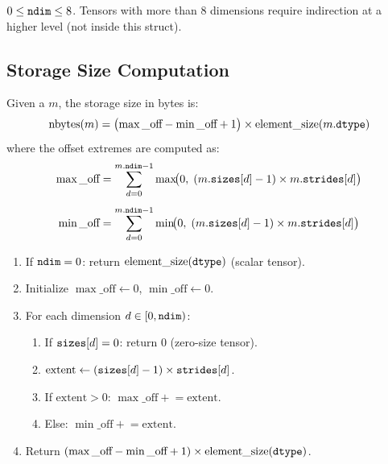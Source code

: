 \begin{invariant}
$0 \le \texttt{ndim} \le 8$.  Tensors with more than 8 dimensions
require indirection at a higher level (not inside this struct).
\end{invariant}

\subsection{Storage Size Computation}
\label{sec:storage-nbytes}

\begin{definition}
\label{def:storage-nbytes}
Given a  $m$, the storage size in bytes is:
\[
  \operatorname{nbytes}(m) = \bigl(\max\_\text{off} - \min\_\text{off} + 1\bigr)
    \times \operatorname{element\_size}(m.\texttt{dtype})
\]
where the offset extremes are computed as:
\begin{align*}
  \max\_\text{off} &= \sum_{d=0}^{m.\texttt{ndim}-1}
    \max\!\bigl(0,\; (m.\texttt{sizes}[d] - 1) \times m.\texttt{strides}[d]\bigr) \\[4pt]
  \min\_\text{off} &= \sum_{d=0}^{m.\texttt{ndim}-1}
    \min\!\bigl(0,\; (m.\texttt{sizes}[d] - 1) \times m.\texttt{strides}[d]\bigr)
\end{align*}
\end{definition}

\begin{algorithm_spec}
\label{alg:storage-nbytes}
\begin{enumerate}
  \item If $\texttt{ndim} = 0$: return $\operatorname{element\_size}(\texttt{dtype})$ (scalar tensor).
  \item Initialize $\max\_\text{off} \leftarrow 0$, $\min\_\text{off} \leftarrow 0$.
  \item For each dimension $d \in [0, \texttt{ndim})$:
    \begin{enumerate}
      \item If $\texttt{sizes}[d] = 0$: return $0$ (zero-size tensor).
      \item $\text{extent} \leftarrow (\texttt{sizes}[d] - 1) \times \texttt{strides}[d]$.
      \item If $\text{extent} > 0$: $\max\_\text{off} \mathrel{+}= \text{extent}$.
      \item Else: $\min\_\text{off} \mathrel{+}= \text{extent}$.
    \end{enumerate}
  \item Return $(\max\_\text{off} - \min\_\text{off} + 1) \times
    \operatorname{element\_size}(\texttt{dtype})$.
\end{enumerate}
\end{algorithm_spec}


